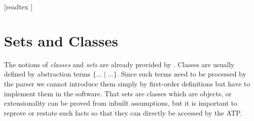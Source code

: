 \documentclass[11pt]{article}
\begin{document}
\begin{forthel}

  [readtex ]
\end{forthel}


\section{Sets and Classes}

The notions of \textit{classes} and \textit{sets} are already
provided by \Naproche. Classes are usually defined by
abstraction terms $\{\dots\mid\dots\}$. Since such terms need to be
processed by the parser we cannot introduce them simply by first-order
definitions but have to implement them in the software.
That sets are classes which are objects, or extensionality can be proved
from inbuilt assumptions, but it is important to reprove or restate such
facts so that they can directly be accessed by the ATP.
\end{document}
